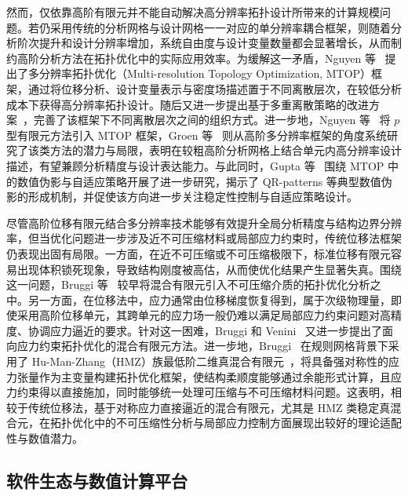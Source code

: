 然而，仅依靠高阶有限元并不能自动解决高分辨率拓扑设计所带来的计算规模问题。若仍采用传统的分析网格与设计网格一一对应的单分辨率耦合框架，则随着分析阶次提升和设计分辨率增加，系统自由度与设计变量数量都会显著增长，从而制约高阶分析方法在拓扑优化中的实际应用效率。为缓解这一矛盾，Nguyen 等~\cite{nguyenComputationalParadigmMultiresolution2010a} 提出了多分辨率拓扑优化（Multi-resolution Topology Optimization, MTOP）框架，通过将位移分析、设计变量表示与密度场描述置于不同离散层次，在较低分析成本下获得高分辨率拓扑设计。随后又进一步提出基于多重离散策略的改进方案~\cite{nguyenImprovingMultiresolutionTopology2012}，完善了该框架下不同离散层次之间的组织方式。进一步地，Nguyen 等~\cite{nguyenTopologyOptimizationUsing2017a} 将 $p$ 型有限元方法引入 MTOP 框架，Groen 等~\cite{groenHigherorderMultiresolutionTopology2017a} 则从高阶多分辨率框架的角度系统研究了该类方法的潜力与局限，表明在较粗高阶分析网格上结合单元内高分辨率设计描述，有望兼顾分析精度与设计表达能力。与此同时，Gupta 等~\cite{guptaQRpatternsArtefactsMultiresolution2018, guptaDesignAnalysisAdaptivity2020} 围绕 MTOP 中的数值伪影与自适应策略开展了进一步研究，揭示了 QR-patterns 等典型数值伪影的形成机制，并促使该方向进一步关注稳定性控制与自适应策略设计。

尽管高阶位移有限元结合多分辨率技术能够有效提升全局分析精度与结构边界分辨率，但当优化问题进一步涉及近不可压缩材料或局部应力约束时，传统位移法框架仍表现出固有局限。一方面，在近不可压缩或不可压缩极限下，标准位移有限元容易出现体积锁死现象，导致结构刚度被高估，从而使优化结果产生显著失真。围绕这一问题，Bruggi 等~\cite{bruggiTopologyOptimizationIncompressible2007a} 较早将混合有限元引入不可压缩介质的拓扑优化分析之中。另一方面，在位移法中，应力通常由位移梯度恢复得到，属于次级物理量，即使采用高阶位移单元，其跨单元的应力场一般仍难以满足局部应力约束问题对高精度、协调应力逼近的要求。针对这一困难，Bruggi 和 Venini~\cite{bruggiMixedFEMApproach2008a} 又进一步提出了面向应力约束拓扑优化的混合有限元方法。进一步地，Bruggi~\cite{bruggiTopologyOptimizationMixed2016a} 在规则网格背景下采用了 Hu-Man-Zhang（HMZ）族最低阶二维真混合有限元~\cite{huSimpleConformingMixed2014a}，将具备强对称性的应力张量作为主变量构建拓扑优化框架，使结构柔顺度能够通过余能形式计算，且应力约束得以直接施加，同时能够统一处理可压缩与不可压缩材料问题。这表明，相较于传统位移法，基于对称应力直接逼近的混合有限元，尤其是 HMZ 类稳定真混合元，在拓扑优化中的不可压缩性分析与局部应力控制方面展现出较好的理论适配性与数值潜力。


\subsection{软件生态与数值计算平台}
\label{subsec:software_computing_platform}

